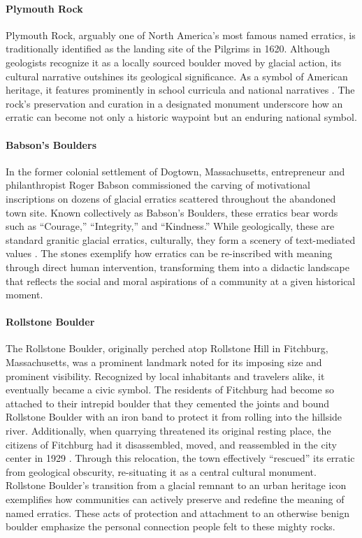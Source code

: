 \documentclass{article}
\begin{document}
\paragraph{Plymouth Rock}
Plymouth Rock, arguably one of North America’s most famous named erratics, is traditionally identified as the landing site of the Pilgrims in 1620. Although geologists recognize it as a locally sourced boulder moved by glacial action, its cultural narrative outshines its geological significance. As a symbol of American heritage, it features prominently in school curricula and national narratives \cite{Hellerstein2007}. The rock’s preservation and curation in a designated monument underscore how an erratic can become not only a historic waypoint but an enduring national symbol.

\paragraph{Babson's Boulders}
In the former colonial settlement of Dogtown, Massachusetts, entrepreneur and philanthropist Roger Babson commissioned the carving of motivational inscriptions on dozens of glacial erratics scattered throughout the abandoned town site. Known collectively as Babson’s Boulders, these erratics bear words such as “Courage,” “Integrity,” and “Kindness.” While geologically, these are standard granitic glacial erratics, culturally, they form a scenery of text-mediated values \cite{Hutton2013, Martin2019}. The stones exemplify how erratics can be re-inscribed with meaning through direct human intervention, transforming them into a didactic landscape that reflects the social and moral aspirations of a community at a given historical moment.

\paragraph{Rollstone Boulder}
The Rollstone Boulder, originally perched atop Rollstone Hill in Fitchburg, Massachusetts, was a prominent landmark noted for its imposing size and prominent visibility. Recognized by local inhabitants and travelers alike, it eventually became a civic symbol. The residents of Fitchburg had become so attached to their intrepid boulder that they cemented the joints and bound Rollstone Boulder with an iron band \cite{Fitchburg1908} to protect it from rolling into the hillside river. Additionally, when quarrying threatened its original resting place, the citizens of Fitchburg had it disassembled, moved, and reassembled in the city center in 1929 \cite{Fitchburg1908}. Through this relocation, the town effectively “rescued” its erratic from geological obscurity, re-situating it as a central cultural monument. Rollstone Boulder’s transition from a glacial remnant to an urban heritage icon exemplifies how communities can actively preserve and redefine the meaning of named erratics. These acts of protection and attachment to an otherwise benign boulder emphasize the personal connection people felt to these mighty rocks.
\end{document}
